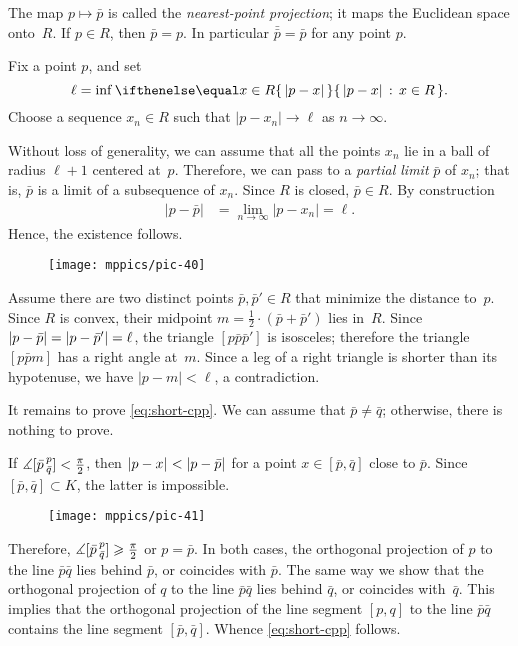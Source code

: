 {The map $p\mapsto \bar p$ is called the \label{nearest-point projection}\emph{nearest-point projection};
it maps the Euclidean space onto~$R$.
If $p\in R$, then $\bar p=p$.
In particular $\bar{\bar p}=\bar p$ for any point $p$.

Fix a point $p$, and set 
\[\ell=\inf\set{|p-x|}{x\in R}.\]
Choose a sequence $x_n\in R$ such that $|p-x_n|\to \ell$ as $n\to\infty$.

Without loss of generality, we can assume that all the points $x_n$ lie in a ball of radius $\ell+1$ centered at~$p$.
Therefore, we can pass to a \emph{partial limit} $\bar p$ of $x_n$; that is, $\bar p$ is a limit of a subsequence of $x_n$.
Since $R$ is closed, $\bar p\in R$.
By construction 
\begin{align*}
|p-\bar p|&=\lim_{n\to\infty}|p-x_n|=\ell.
\end{align*}
Hence, the existence follows.

{

\begin{wrapfigure}{l}{22 mm}
\vskip-0mm
\centering
\texttt{[image: mppics/pic-40]}
\vskip-0mm
\end{wrapfigure}

Assume there are two distinct points $\bar p, \bar p'\in R$ that minimize the distance to~$p$.
Since $R$ is convex, their midpoint $m=\tfrac12\cdot (\bar p+\bar p')$ lies in~$R$.
Since $|p-\bar p|\z=|p-\bar p'|=\ell$, the triangle $[p\bar p\bar p']$ is isosceles; therefore the triangle $[p\bar p m]$ has a right angle at~$m$.
Since a leg of a right triangle is shorter than its hypotenuse, we have $|p-m|<\ell$, a contradiction. 

It remains to prove \ref{eq:short-cpp}.
We can assume that $\bar p\ne\bar q$; otherwise, there is nothing to prove.

}

If $\measuredangle [\bar p\,{}^{p}_{\bar q}]< \tfrac\pi2$, then $\dist{p}{x}{}\z<\dist{p}{\bar p}{}$ for a point $x\in [\bar p,\bar q]$ close to $\bar p$.
Since $[\bar p,\bar q]\subset K$,
the latter is impossible.
{

\begin{wrapfigure}{r}{37 mm}
\vskip-4mm
\centering
\texttt{[image: mppics/pic-41]}
\vskip-0mm
\end{wrapfigure}

Therefore, $\measuredangle [\bar p\,{}^{p}_{\bar q}]\geqslant \tfrac\pi2$ or $p=\bar p$.
In both cases, the orthogonal projection of $p$ to the line $\bar p\bar q$ lies behind $\bar p$, or coincides with $\bar p$.
The same way we show that the orthogonal projection of $q$ to the line $\bar p\bar q$ lies behind $\bar q$, or coincides with~$\bar q$.
This implies that the orthogonal projection of the line segment $[p,q]$ to the line $\bar p\bar q$ contains the line segment $[\bar p,\bar q]$.
Whence \ref{eq:short-cpp} follows.
\qeds

}}
